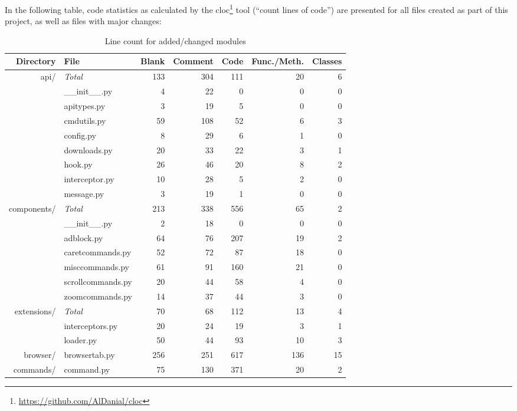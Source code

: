 In the following table, code statistics as calculated by the
cloc\footnote{\url{https://github.com/AlDanial/cloc}} tool (``count lines of
code'') are presented for all files created as part of this project, as well as
files with major changes:

\begingroup
\renewcommand{\arraystretch}{1}
\begin{table}[H]
  \centering
  \begin{tabulary}{\linewidth}{rlrrrrr}
    \toprule
    Directory & File & Blank & Comment & Code & Func./Meth. & Classes \\
    \midrule
    api/ & \emph{Total} & 133 & 304 & 111 & 20 & 6 \\
    & \_\_init\_\_.py & 4 & 22 & 0 & 0 & 0 \\
    & apitypes.py & 3 & 19 & 5 & 0 & 0 \\
    & cmdutils.py & 59 & 108 & 52 & 6 & 3 \\
    & config.py & 8 & 29 & 6 & 1 & 0 \\
    & downloads.py & 20 & 33 & 22 & 3 & 1 \\
    & hook.py & 26 & 46 & 20 & 8 & 2 \\
    & interceptor.py & 10 & 28 & 5 & 2 & 0 \\
    & message.py & 3 & 19 & 1 & 0 & 0\vspace{1em} \\
    components/ & \emph{Total} & 213 & 338 & 556 & 65 & 2 \\
    & \_\_init\_\_.py & 2 & 18 & 0 & 0 & 0 \\
    & adblock.py & 64 & 76 & 207 & 19 & 2 \\
    & caretcommands.py & 52 & 72 & 87 & 18 & 0 \\
    & misccommands.py & 61 & 91 & 160 & 21 & 0 \\
    & scrollcommands.py & 20 & 44 & 58 & 4 & 0 \\
    & zoomcommands.py & 14 & 37 & 44 & 3 & 0\vspace{1em} \\
    extensions/ & \emph{Total} & 70 & 68 & 112 & 13 & 4 \\
    & interceptors.py & 20 & 24 & 19 & 3 & 1 \\
    & loader.py & 50 & 44 & 93 & 10 & 3\vspace{1em} \\
    browser/ & browsertab.py & 256 & 251 & 617 & 136 & 15 \\
    commands/ & command.py & 75 & 130 & 371 & 20 & 2 \\
    \bottomrule
  \end{tabulary}
  \caption{Line count for added/changed modules}
  \label{tab:coverage}
\end{table}
\endgroup

